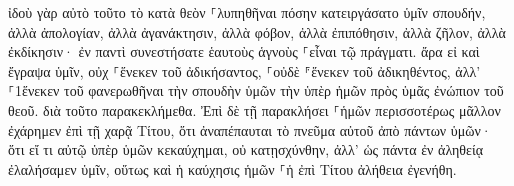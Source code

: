\documentclass{openreader}
\begin{document}
ἰδοὺ γὰρ αὐτὸ τοῦτο τὸ κατὰ θεὸν ⸀λυπηθῆναι πόσην κατειργάσατο ὑμῖν σπουδήν, ἀλλὰ ἀπολογίαν, ἀλλὰ ἀγανάκτησιν, ἀλλὰ φόβον, ἀλλὰ ἐπιπόθησιν, ἀλλὰ ζῆλον, ἀλλὰ ἐκδίκησιν· ἐν παντὶ συνεστήσατε ἑαυτοὺς ἁγνοὺς ⸀εἶναι τῷ πράγματι. 
ἄρα εἰ καὶ ἔγραψα ὑμῖν, οὐχ ⸀ἕνεκεν τοῦ ἀδικήσαντος, ⸀οὐδὲ ⸁ἕνεκεν τοῦ ἀδικηθέντος, ἀλλ’ ⸀1ἕνεκεν τοῦ φανερωθῆναι τὴν σπουδὴν ὑμῶν τὴν ὑπὲρ ἡμῶν πρὸς ὑμᾶς ἐνώπιον τοῦ θεοῦ. 
διὰ τοῦτο παρακεκλήμεθα. Ἐπὶ δὲ τῇ παρακλήσει ⸀ἡμῶν περισσοτέρως μᾶλλον ἐχάρημεν ἐπὶ τῇ χαρᾷ Τίτου, ὅτι ἀναπέπαυται τὸ πνεῦμα αὐτοῦ ἀπὸ πάντων ὑμῶν· 
ὅτι εἴ τι αὐτῷ ὑπὲρ ὑμῶν κεκαύχημαι, οὐ κατῃσχύνθην, ἀλλ’ ὡς πάντα ἐν ἀληθείᾳ ἐλαλήσαμεν ὑμῖν, οὕτως καὶ ἡ καύχησις ἡμῶν ⸀ἡ ἐπὶ Τίτου ἀλήθεια ἐγενήθη. 
\end{document}
